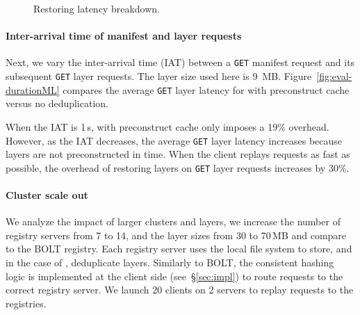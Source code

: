 \begin{figure}[t]
\begin{minipage}{0.3\textwidth}
	\caption{Restoring latency breakdown. }
	\label{fig:eval-restoringbreakdown}
	\end{minipage}
\end{figure}
 
\paragraph{Inter-arrival time of manifest and layer requests}
%
Next, we vary the inter-arrival time (IAT) between a \texttt{GET} manifest request and its
subsequent \texttt{GET} layer requests.
%
The layer size used here is 9~MB.
%
Figure~\ref{fig:eval-durationML} compares the average \texttt{GET} layer latency for
\sysname with preconstruct cache versus no deduplication.

When the IAT is 1\,s, \sysname with preconstruct cache only imposes a 19\% overhead.
%
However, as the IAT decreases, the average \texttt{GET} layer latency increases because
layers are not preconstructed in time.
%
When the client replays requests as fast as possible, the overhead of restoring layers on
\texttt{GET} layer requests increases by 30\%.
%


\paragraph{Cluster scale out}
%
We analyze the impact of larger clusters and layers, we increase the number of registry servers from
7 to 14, and the layer sizes from 30 to 70\,MB and compare \sysname to the BOLT registry.
%
%
Each registry server uses the local file system to store, and in the case of \sysname, deduplicate layers.
%
Similarly to BOLT, the consistent hashing logic is implemented at the client
side (see~\S\ref{sec:impl}) to route requests to the correct registry server.
We launch 20 clients on 2 servers to replay requests to the registries.

